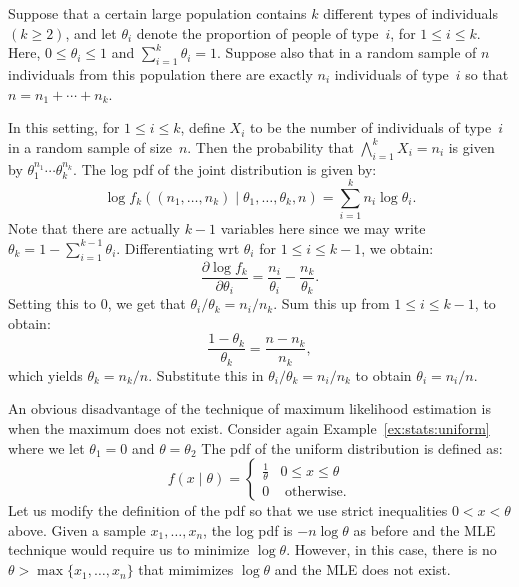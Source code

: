 \begin{example}
Suppose that a certain large population contains $k$ different types of 
individuals $(k \geq 2)$, and let $\theta_i$ denote the proportion of people 
of type~$i$, for $1 \leq i \leq k$. Here, $0 \leq \theta_i \leq 1$ and 
$\sum_{i = 1}^k \theta_i = 1$. Suppose also that in a random sample of $n$ 
individuals from this population there are exactly $n_i$ individuals of type~$i$
so that $n = n_1 + \cdots + n_k$.

In this setting, for $1 \leq i \leq k$, define $X_i$ to be the number of 
individuals of type~$i$ in a random sample of size~$n$. Then the probability 
that $\bigwedge_{i = 1}^k X_i = n_i$ is given by $\theta_1^{n_1} \cdots \theta_k^{n_k}$.  
The log pdf of the joint distribution is given by:
\[
    \log f_k((n_1, \ldots, n_k) \mid \theta_1, \ldots, \theta_k, n) 
        = \sum_{i = 1}^k n_i \log \theta_i. 
\] 
Note that there are actually $k - 1$ variables here since we may write 
$\theta_k = 1 - \sum_{i = 1}^{k - 1} \theta_i$. Differentiating wrt $\theta_i$
for $1 \leq i \leq k - 1$, we obtain:
\[
    \frac{\partial \log f_k}{\partial \theta_i} 
        = \frac{n_i}{\theta_i} - \frac{n_k}{\theta_k}. 
\]
Setting this to $0$, we get that $\theta_i / \theta_k = n_i / n_k$. Sum this up
from $1 \leq i \leq k - 1$, to obtain:
\[
    \frac{1 - \theta_k}{\theta_k} = \frac{n - n_k}{n_k},
\] 
which yields $\theta_k = n_k / n$. Substitute this in $\theta_i / \theta_k = n_i / n_k$
to obtain $\theta_i = n_i / n$.
\end{example} 

\begin{example}
An obvious disadvantage of the technique of maximum likelihood estimation 
is when the maximum does not exist. Consider again Example~\ref{ex:stats:uniform}
where we let $\theta_1 = 0$ and $\theta = \theta_2$
The pdf of the uniform distribution is defined as:
\[
    f(x \mid \theta) 
        = \left \{ 
            \begin{array}{ll}
                \frac{1}{\theta} & 0 \leq x \leq \theta \\
                0  & \text{ otherwise}. 
            \end{array}
          \right . 
\]
Let us modify the definition of the pdf so that we use strict inequalities 
$0 < x < \theta$ above. Given a sample $x_1, \ldots, x_n$, the log pdf is 
$- n \log \theta$ as before and the MLE technique would require us to 
minimize $\log \theta$. However, in this case, there is no  
$\theta > \max \{x_1, \ldots, x_n\}$ that mimimizes $\log \theta$ and the 
MLE does not exist.    
\end{example}


